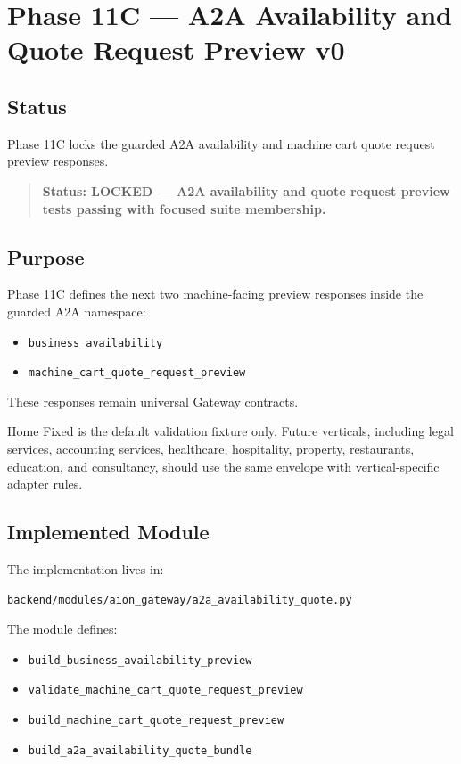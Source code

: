 \section{Phase 11C --- A2A Availability and Quote Request Preview v0}
\label{sec:aion-a2a-availability-quote-preview-v0}

\subsection{Status}

Phase 11C locks the guarded A2A availability and machine cart quote request preview responses.

\begin{quote}
\textbf{Status: LOCKED --- A2A availability and quote request preview tests passing with focused suite membership.}
\end{quote}

\subsection{Purpose}

Phase 11C defines the next two machine-facing preview responses inside the guarded A2A namespace:

\begin{itemize}
  \item \texttt{business\_availability}
  \item \texttt{machine\_cart\_quote\_request\_preview}
\end{itemize}

These responses remain universal Gateway contracts.

Home Fixed is the default validation fixture only. Future verticals, including legal services, accounting services, healthcare, hospitality, property, restaurants, education, and consultancy, should use the same envelope with vertical-specific adapter rules.

\subsection{Implemented Module}

The implementation lives in:

\begin{verbatim}
backend/modules/aion_gateway/a2a_availability_quote.py
\end{verbatim}

The module defines:

\begin{itemize}
  \item \texttt{build\_business\_availability\_preview}
  \item \texttt{validate\_machine\_cart\_quote\_request\_preview}
  \item \texttt{build\_machine\_cart\_quote\_request\_preview}
  \item \texttt{build\_a2a\_availability\_quote\_bundle}
\end{itemize}

